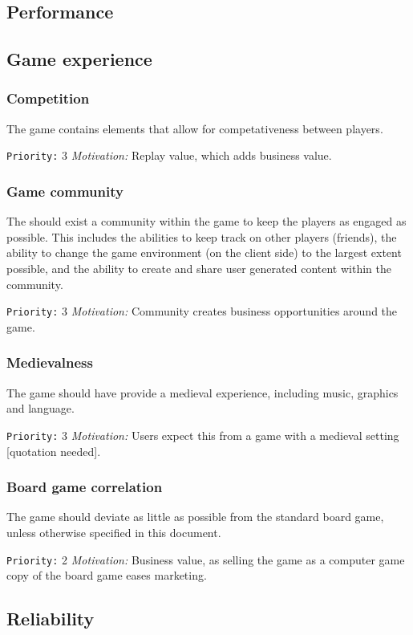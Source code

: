 \documentclass[a4paper,10pt]{article}
\newcommand{\prio}[2]{\texttt{Priority:} #1 \emph{Motivation:} #2}
\begin{document}
\subsection{Performance}

\subsection{Game experience}
\subsubsection{Competition}
\label{req:competition}
The game contains elements that allow for competativeness between players.

\prio{3}{Replay value, which adds business value.}

\subsubsection{Game community}
The should exist a community within the game to keep the players as engaged as possible. This includes the abilities to keep track on other players (friends), the ability to change the game environment (on the client side) to the largest extent possible, and the ability to create and share user generated content within the community.

\prio{3}{Community creates business opportunities around the game.}

\subsubsection{Medievalness}
The game should have provide a medieval experience, including music, graphics and language.

\prio{3}{Users expect this from a game with a medieval setting [quotation needed].}

\subsubsection{Board game correlation}
\label{req:boardgamecorrelation}
The game should deviate as little as possible from the standard board game, unless otherwise specified in this document.

\prio{2}{Business value, as selling the game as a computer game copy of the board game eases marketing.}

\subsection{Reliability}
\end{document}
